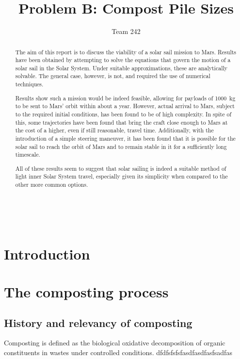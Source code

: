 \documentclass[12pt, a4paper, twocolumn, twoside]{article}
\title{\sffamily \bfseries Problem B: Compost Pile Sizes}
\author{\sffamily Team 242}
\date{}
\numberwithin{table}{section}
\numberwithin{figure}{section}
\numberwithin{equation}{section}
\begin{document}
\renewcommand{\abstractname}{}
\renewcommand{\absnamepos}{empty}
\begin{titlingpage}
 	\maketitle

	\noindent \hrulefill \\
	\begin{abstract}
		The aim of this report is to discuss the viability of a solar sail mission to Mars. Results have been obtained by attempting to solve the equations that govern the motion of a solar sail in the Solar System. Under suitable approximations, these are analytically solvable. The general case, however, is not, and required the use of numerical techniques. 

		Results show such a mission would be indeed feasible, allowing for payloads of \SI{1000}{kg} to be sent to Mars' orbit within about a year. However, actual arrival to Mars, subject to the required initial conditions, has been found to be of high complexity. In spite of this, some trajectories have been found that bring the craft close enough to Mars at the cost of a higher, even if still reasonable, travel time. Additionally, with the introduction of a simple steering maneuver, it has been found that it is possible for the solar sail to reach the orbit of Mars and to remain stable in it for a sufficiently long timescale.

		All of these results seem to suggest that solar sailing is indeed a suitable method of light inner Solar System travel, especially given its simplicity when compared to the other more common options. 
	\end{abstract}
	\hrulefill
\end{titlingpage}

\begin{titlingpage}
	\tableofcontents
\end{titlingpage}

\section{Introduction}
\cite{mason}

\section{The composting process}
\subsection{History and relevancy of composting}
Composting is defined as the biological oxidative decomposition of organic constituents in wastes under controlled conditions. dfdfsfsfsfasdfasdfasfsadfas
\end{document}
